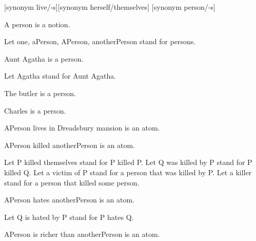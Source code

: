 \documentclass{article}
\begin{document}
\begin{forthel}

[synonym live/-s][synonym herself/themselves]
[synonym person/-s]

\begin{signature}
A person is a notion.
\end{signature}

Let one, aPerson, APerson, anotherPerson  stand for persons.

\begin{signature}
Aunt Agatha is a person.
\end{signature}

Let Agatha stand for Aunt Agatha.

\begin{signature}
The butler is a person.
\end{signature}

\begin{signature}
Charles is a person.
\end{signature}

\begin{signature}
APerson lives in Dreadsbury mansion is an atom.
\end{signature}

\begin{signature}
APerson killed anotherPerson is an atom.
\end{signature}

Let P killed themselves stand for P killed P.
Let Q was killed by P stand for P killed Q.
Let a victim of P stand for a person that was killed by P.
Let a killer stand for a person that killed some person.

\begin{signature}
APerson hates anotherPerson is an atom.
\end{signature}
Let Q is hated by P stand for P hates Q.

\begin{signature}
APerson is richer than anotherPerson is an atom.
\end{signature}

\end{forthel}
\end{document}
